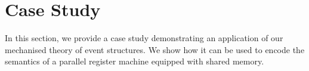\section{Case Study}

In this section, we provide a case study demonstrating 
an application of our mechanised theory of event structures.
We show how it can be used to encode the semantics of 
a parallel register machine equipped with shared memory.



% 
